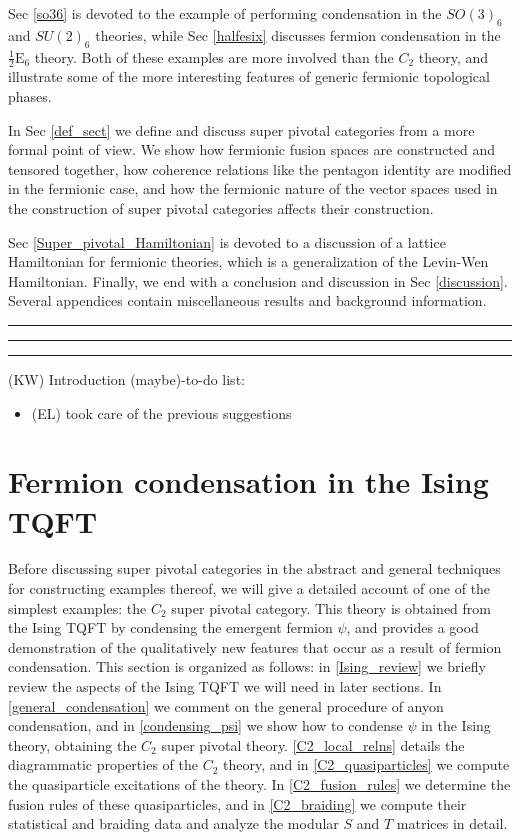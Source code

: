 \documentclass[12pt,a4paper]{article}
\newcommand{\ethan}[1]{{\color{amethyst}\footnotesize{(EL) #1}}}
\newcommand{\kwsep}{\bigskip\hrule\medskip\hrule\medskip\hrule\bigskip}
\newcommand{\halfesix}{\frac{1}{2}\text{E}_6}
\begin{document}
Sec \ref{so36} is devoted to the example of performing condensation in the $SO(3)_6$ 
and $SU(2)_6$ theories, while Sec \ref{halfesix} discusses fermion condensation in the $
\halfesix$ theory. 
Both of these examples are more involved than the $C_2$ theory, 
and illustrate some of the more interesting features of generic fermionic topological phases. 

In Sec \ref{def_sect} we define and discuss super pivotal categories from a more formal point of view. 
We show how fermionic fusion spaces are constructed and tensored together, how 
coherence relations like the pentagon identity are modified in the fermionic case, 
and how the fermionic nature of the vector spaces used in the construction of super 
pivotal categories affects their construction. 

Sec \ref{Super_pivotal_Hamiltonian} is devoted to a discussion of a lattice Hamiltonian for fermionic theories, which is a generalization of the Levin-Wen Hamiltonian. 
Finally, we end with a conclusion and discussion in Sec \ref{discussion}. 
Several appendices contain miscellaneous results and background information. 

\kwsep

(KW) Introduction (maybe)-to-do list:
\begin{itemize}
\item \ethan{took care of the previous suggestions}
\end{itemize}


\section{Fermion condensation in the Ising TQFT}  \label{C2_condense_sect}

Before discussing super pivotal categories in the abstract and general techniques for constructing examples thereof,
we will give a detailed account of one of the simplest examples:
the $C_2$ super pivotal category.
This theory 
is obtained from the Ising TQFT by condensing the emergent fermion $\psi$, and provides a good demonstration of the qualitatively new features that occur as a result of fermion condensation. 
This section is organized as follows: in \ref{Ising_review} we briefly review the aspects of the Ising TQFT we will need in later sections. 
In \ref{general_condensation} we comment on the general procedure of anyon condensation, and in \ref{condensing_psi} we show how to condense $\psi$ in the Ising theory, obtaining the $C_2$ super pivotal theory. 
\ref{C2_local_relns} details the diagrammatic properties of the $C_2$ theory, and in \ref{C2_quasiparticles} we compute the quasiparticle excitations of the theory. 
In \ref{C2_fusion_rules} we determine the fusion rules of these quasiparticles, and in \ref{C2_braiding} we compute their statistical and braiding data and analyze the modular $S$ and $T$ matrices in detail. 
\end{document}
